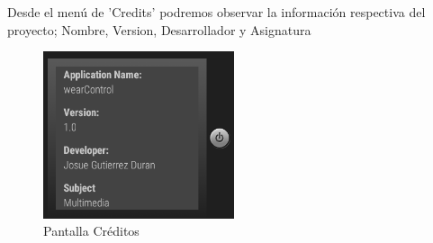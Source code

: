 \documentclass{documentation}
\begin{document}
Desde el menú de 'Credits' podremos observar la información respectiva del proyecto; Nombre, Version, Desarrollador y Asignatura

\begin{figure}[!ht]
	\centering
	\includegraphics[width=0.5\textwidth]{figures/sw/6.png}
	\caption{Pantalla Créditos}
\end{figure}
\end{document}
